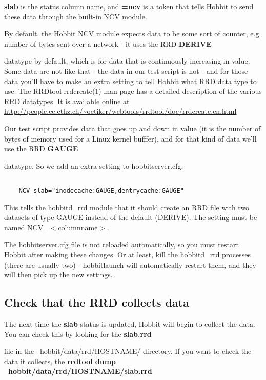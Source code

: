  \textbf{slab}
 is the status column name, and \textbf{=ncv}
 is a token that tells Hobbit to send these data through the built-in NCV module.


 By default, the Hobbit NCV module expects data to be some sort of
 counter, e.g. number of bytes sent over a network - it uses the RRD
 \textbf{DERIVE}

 datatype by default, which is for data that is continuously
 increasing in value. Some data are not like that - the data in our
 test script is not - and for those data you'll have to make an extra
 setting to tell Hobbit what RRD data type to use. The RRDtool
 rrdcreate(1) man-page has a detailed description of the various RRD
 datatypes. It is available online at
 \url{http://people.ee.ethz.ch/~oetiker/webtools/rrdtool/doc/rrdcreate.en.html}



 Our test script provides data that goes up and down in value (it is
 the number of bytes of memory used for a Linux kernel bufffer), and
 for that kind of data we'll use the RRD \textbf{GAUGE}

 datatype. So we add an extra setting to hobbitserver.cfg:
\begin{verbatim}

	NCV_slab="inodecache:GAUGE,dentrycache:GAUGE"

\end{verbatim}


 This tells the hobbitd\_rrd module that it should create an RRD file
 with two datasets of type GAUGE instead of the default (DERIVE). The
 setting must be named NCV\_$<$columnname$>$.



 The hobbitserver.cfg file is not reloaded automatically, so you must
 restart Hobbit after making these changes. Or at least, kill the
 hobbitd\_rrd processes (there are usually two) - hobbitlaunch will
 automatically restart them, and they will then pick up the new
 settings.

\subsection{Check that the RRD collects data}


 The next time the \textbf{slab}
 status is updated, Hobbit will begin to collect the data. You can
 check this by looking for the \textbf{slab.rrd}

 file in the ~hobbit/data/rrd/HOSTNAME/ directory. If you want to
 check the data it collects, the \textbf{rrdtool dump
 ~hobbit/data/rrd/HOSTNAME/slab.rrd}

